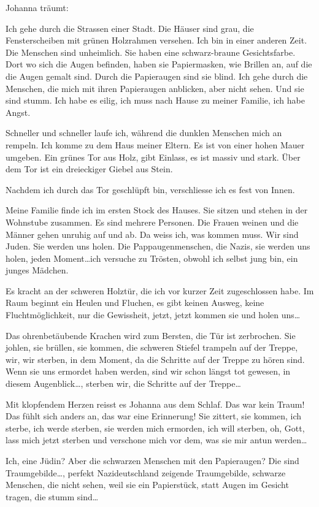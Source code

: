 \documentclass[10pt,titlepage,a5paper]{book}
\begin{document}
Johanna träumt:

Ich gehe durch die Strassen einer Stadt. Die Häuser sind grau, die Fensterscheiben mit grünen Holzrahmen versehen. Ich bin in einer anderen Zeit. Die Menschen sind unheimlich. Sie haben eine schwarz-braune Gesichtsfarbe. Dort wo sich die Augen befinden, haben sie Papiermasken, wie Brillen an, auf die die Augen gemalt sind. Durch die Papieraugen sind sie blind. Ich gehe durch die Menschen,  die mich mit ihren Papieraugen anblicken, aber nicht sehen. Und sie sind stumm. Ich habe es eilig, ich muss nach Hause zu meiner Familie, ich habe Angst.

Schneller und schneller laufe ich, während die dunklen Menschen mich an rempeln. Ich komme zu dem Haus meiner Eltern. Es ist von einer hohen Mauer umgeben. Ein grünes Tor aus Holz, gibt Einlass, es ist massiv und stark. Über dem Tor ist ein dreieckiger Giebel aus Stein. 

Nachdem ich durch das Tor geschlüpft bin, verschliesse ich es fest von Innen. 

Meine Familie finde ich im ersten Stock des Hauses. Sie sitzen und stehen in der Wohnstube zusammen. Es sind mehrere Personen. Die Frauen weinen und die Männer gehen unruhig auf und ab. Da weiss ich, was kommen muss. Wir sind Juden. Sie werden uns holen. Die Pappaugenmenschen, die Nazis, sie werden uns holen, jeden Moment\dots  ich versuche zu Trösten, obwohl ich selbst jung bin, ein junges Mädchen.

Es kracht an der schweren Holztür, die ich vor kurzer Zeit zugeschlossen habe. Im Raum beginnt ein Heulen und Fluchen, es gibt keinen Ausweg, keine Fluchtmöglichkeit, nur die Gewissheit, jetzt, jetzt kommen sie und holen uns\dots 

Das ohrenbetäubende Krachen wird zum Bersten, die Tür ist zerbrochen. Sie johlen, sie brüllen, sie kommen, die schweren Stiefel trampeln auf der Treppe, wir, wir sterben, in dem Moment, da die Schritte auf der Treppe zu hören sind. Wenn sie uns ermordet haben werden, sind wir schon längst tot gewesen, in diesem Augenblick\dots , sterben wir, die Schritte auf der Treppe\dots 

Mit klopfendem Herzen reisst es Johanna aus dem Schlaf. Das war kein Traum! Das fühlt sich anders an, das war eine Erinnerung! Sie zittert, sie kommen, ich sterbe, ich werde sterben, sie werden mich ermorden, ich will sterben, oh, Gott, lass mich jetzt sterben und verschone mich vor dem, was sie mir antun werden\dots 

Ich, eine Jüdin? Aber die schwarzen Menschen mit den Papieraugen? Die sind Traumgebilde\dots , perfekt Nazideutschland zeigende Traumgebilde, schwarze Menschen, die nicht sehen, weil sie ein Papierstück, statt Augen im Gesicht tragen, die stumm sind\dots 
\end{document}
